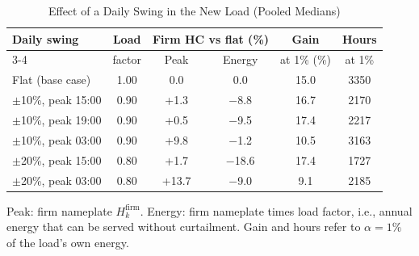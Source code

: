 \begin{table}[t]
\centering
\caption{Effect of a Daily Swing in the New Load (Pooled Medians)}
\label{tab:shapes}
\setlength{\tabcolsep}{2.6pt}
\begin{tabular}{lccccc}
\toprule
Daily swing & Load & \multicolumn{2}{c}{Firm HC vs flat (\%)} & Gain & Hours \\
\cmidrule(lr){3-4}
 & factor & Peak & Energy & at 1\% (\%) & at 1\% \\
\midrule
Flat (base case) & 1.00 & 0.0 & 0.0 & 15.0 & 3350 \\
$\pm$10\%, peak 15:00 & 0.90 & +1.3 & $-$8.8 & 16.7 & 2170 \\
$\pm$10\%, peak 19:00 & 0.90 & +0.5 & $-$9.5 & 17.4 & 2217 \\
$\pm$10\%, peak 03:00 & 0.90 & +9.8 & $-$1.2 & 10.5 & 3163 \\
$\pm$20\%, peak 15:00 & 0.80 & +1.7 & $-$18.6 & 17.4 & 1727 \\
$\pm$20\%, peak 03:00 & 0.80 & +13.7 & $-$9.0 & 9.1 & 2185 \\
\bottomrule
\end{tabular}
\vspace{2pt}
\begin{minipage}{\columnwidth}\footnotesize Peak: firm nameplate $H_k^{\mathrm{firm}}$. Energy: firm nameplate times load factor, i.e., annual energy that can be served without curtailment. Gain and hours refer to $\alpha=1\%$ of the load's own energy.\end{minipage}
\end{table}
